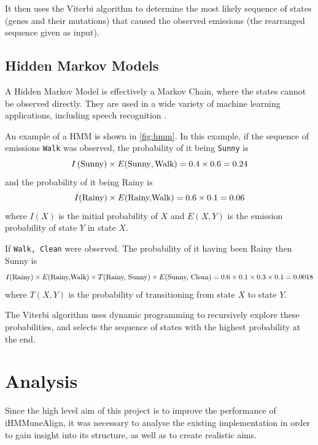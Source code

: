 It then uses the Viterbi algorithm to determine the most likely sequence of states (genes and their mutations) that caused the observed emissions (the rearranged sequence given as input).

\section{Hidden Markov Models}

A Hidden Markov Model is effectively a Markov Chain, where the states cannot be observed directly. They are used in a wide variety of machine learning applications, including speech recognition \autocite{hmm}.

An example of a HMM is shown in \autoref{fig:hmm}. In this example, if the sequence of emissions \texttt{Walk} was observed, the probability of it being \texttt{Sunny} is
$$I\left(\textnormal{Sunny}\right) \times E(\textnormal{Sunny},\textnormal{Walk}) = 0.4 \times 0.6 = 0.24$$
and the probability of it being Rainy is
$$I(\textnormal{Rainy}) \times E(\textnormal{Rainy,Walk}) =
0.6 \times 0.1 = 0.06$$
where $I(X)$ is the initial probability of $X$ and $E(X,Y)$ is the emission probability of state $Y$ in state $X$.

If \texttt{Walk, Clean} were observed. The probability of it having been Rainy then Sunny is
$$
  I(\textnormal{Rainy})
  \times
  E(\textnormal{Rainy,Walk})
  \times
  T(\textnormal{Rainy, Sunny})
  \times
  E(\textnormal{Sunny, Clean})
  =
  0.6 \times 0.1 \times 0.3 \times 0.1
  = 0.0018
$$
where $T(X, Y)$ is the probability of transitioning from state $X$ to state $Y$.

The Viterbi algorithm uses dynamic programming to recursively explore these probabilities, and selects the sequence of states with the highest probability at the end.

\chapter{Analysis}
Since the high level aim of this project is to improve the performance of iHMMuneAlign, it was necessary to analyse the existing implementation in order to gain insight into its structure, as well as to create realistic aims.

